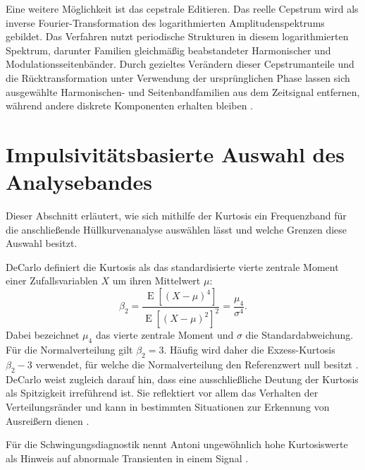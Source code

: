 Eine weitere Möglichkeit ist das cepstrale Editieren. Das reelle Cepstrum
wird als inverse Fourier-Transformation des logarithmierten
Amplitudenspektrums gebildet. Das Verfahren nutzt periodische Strukturen in
diesem logarithmierten Spektrum, darunter Familien gleichmäßig beabstandeter
Harmonischer und Modulationsseitenbänder. Durch gezieltes Verändern dieser
Cepstrumanteile und die Rücktransformation unter Verwendung der ursprünglichen
Phase lassen sich ausgewählte Harmonischen- und Seitenbandfamilien aus dem
Zeitsignal entfernen, während andere diskrete Komponenten erhalten bleiben
\cite[S.~16--18, Abschn.~6--7]
{randallComparisonMethodsSeparation2011}.

\section{Impulsivitätsbasierte Auswahl des Analysebandes}
\label{sec:bandauswahl}

Dieser Abschnitt erläutert, wie sich mithilfe der Kurtosis ein Frequenzband
für die anschließende Hüllkurvenanalyse auswählen lässt und welche Grenzen
diese Auswahl besitzt.

\label{par:kurtosis_spektrale_kurtosis}
DeCarlo definiert die Kurtosis als das standardisierte vierte zentrale Moment
einer Zufallsvariablen $X$ um ihren Mittelwert $\mu$:
\begin{equation}
    \beta_2 =
    \frac{\operatorname{E}\!\left[(X-\mu)^4\right]}
         {\operatorname{E}\!\left[(X-\mu)^2\right]^2}
    = \frac{\mu_4}{\sigma^4}.
    \label{eq:kurtosis}
\end{equation}
Dabei bezeichnet $\mu_4$ das vierte zentrale Moment und $\sigma$ die
Standardabweichung. Für die Normalverteilung gilt $\beta_2=3$. Häufig wird
daher die Exzess-Kurtosis $\beta_2-3$ verwendet, für welche die
Normalverteilung den Referenzwert null besitzt
\cite[S.~292]{decarloMeaningUseKurtosis}. DeCarlo weist zugleich darauf hin,
dass eine ausschließliche Deutung der Kurtosis als Spitzigkeit irreführend ist.
Sie reflektiert vor allem das Verhalten der Verteilungsränder und kann in
bestimmten Situationen zur Erkennung von Ausreißern dienen
\cite[S.~294 und 298]{decarloMeaningUseKurtosis}.

Für die Schwingungsdiagnostik nennt Antoni ungewöhnlich hohe Kurtosiswerte als
Hinweis auf abnormale Transienten in einem Signal
\cite[S.~117, Abschn.~4.2, Aufzählungspunkt~1]
{antoniFastComputationKurtogram2007}.

